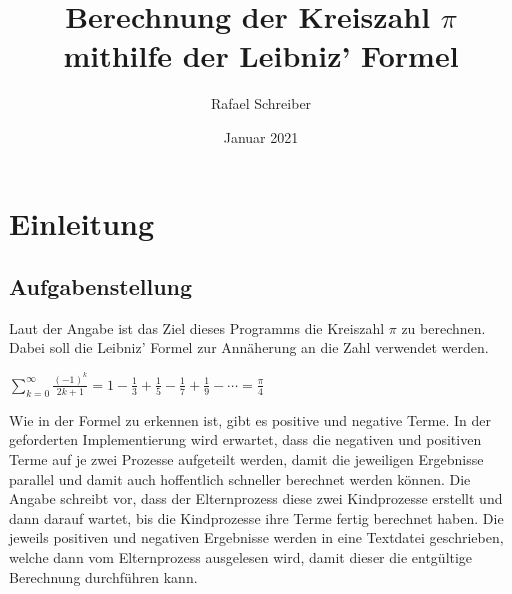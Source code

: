 \documentclass[12pt]{article}
\begin{document}
\clearpage
\thispagestyle{empty}
\author{Rafael Schreiber}
\date{Januar 2021}
\title{Berechnung der Kreiszahl $\pi$ mithilfe der Leibniz' Formel}
\maketitle
\clearpage
{}
\tableofcontents
\newpage

\section{Einleitung}
\subsection{Aufgabenstellung}
Laut der Angabe ist das Ziel dieses Programms die Kreiszahl $\pi$ zu berechnen. 
Dabei soll die Leibniz' Formel \cite{leibnizformular} zur Annäherung an die 
Zahl verwendet werden.
\begin{center}
$\sum_{k=0}^{\infty}{\frac{(-1)^{k}}{2k+1}}=1-{\frac{1}{3}}+
{\frac{1}{5}}-{\frac{1}{7}}+{\frac{1}{9}}-\dotsb={\frac{\pi}{4}}$
\end{center}
Wie in der Formel zu erkennen ist, gibt es positive und negative Terme. 
In der geforderten Implementierung wird erwartet, dass die negativen und 
positiven Terme auf je zwei Prozesse aufgeteilt werden, damit die jeweiligen 
Ergebnisse parallel und damit auch hoffentlich  schneller berechnet werden 
können.
\newline
Die Angabe schreibt vor, dass der Elternprozess diese zwei Kindprozesse 
erstellt und dann darauf wartet, bis die Kindprozesse ihre Terme fertig 
berechnet haben. Die jeweils positiven und negativen Ergebnisse werden in 
eine Textdatei geschrieben, welche dann vom Elternprozess ausgelesen wird, 
damit dieser die entgültige Berechnung durchführen kann.
\newpage
\end{document}
